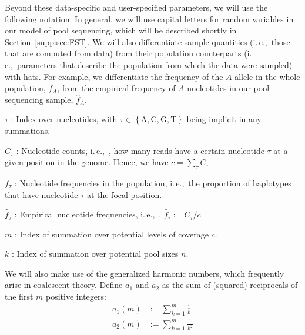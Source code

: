 \documentclass[a4paper,fontsize=9pt,DIV=14]{scrartcl}
\newcommand\secref[1]{Section~\ref{#1}}
\newcommand{\samplesize}{n}
\newcommand{\coverage}{c}
\newcommand{\empfreq}{\widehat{f}}
\newcommand{\ie}{i.\,e.,~}
\begin{document}
Beyond these data-specific and user-specified parameters, we will use the following notation.  In general, we will use capital letters for random variables in our model of pool sequencing, which will be described shortly in \secref{supp:sec:FST}.  We will also differentiate sample quantities (\ie those that are computed from data) from their population counterparts (\ie parameters that describe the population from which the data were sampled) with hats.  For example, we differentiate the frequency of the $A$ allele in the whole population, $f_A$, from the empirical frequency of $A$ nucleotides in our pool sequencing sample, $\empfreq_A$.

$\tau$ :
Index over nucleotides, with $\tau \in \left\{ \text{A}, \text{C}, \text{G}, \text{T} \right\}$ being implicit in any summations.

$C_\tau$ :
Nucleotide counts, \ie, how many reads have a certain nucleotide $\tau$ at a given position in the genome.
Hence, we have $\coverage = \sum_\tau C_\tau$.

$f_\tau$ :
Nucleotide frequencies in the population, \ie the proportion of haplotypes that have nucleotide $\tau$ at the focal position.

$\empfreq_\tau$ :
Empirical nucleotide frequencies, \ie, $\empfreq_\tau := C_\tau / \coverage$. %


$m$ :
Index of summation over potential levels of coverage $\coverage$.

$k$ :
Index of summation over potential pool sizes $\samplesize$.




We will also make use of the generalized harmonic numbers, which frequently arise in coalescent theory.   Define $a_1$ and $a_2$
as the sum of (squared) reciprocals of the first $m$ positive integers:
%
\begin{align}
    \label{eq:an}
    a_1(m) &:= \sum_{k=1}^{m} \frac{1}{k}
    \\
    \label{eq:bn}
    a_2(m) &:= \sum_{k=1}^{m} \frac{1}{k^2}
\end{align}
%
\end{document}
